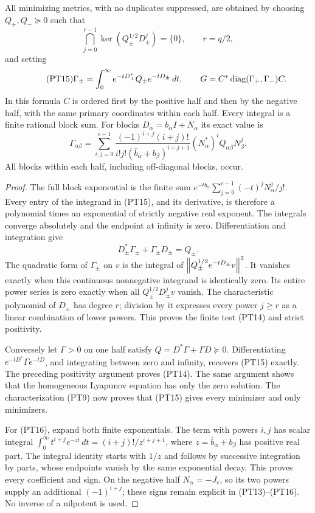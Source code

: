 \begin{theorem}
All minimizing metrics, with no duplicates suppressed, are obtained
by choosing \(Q_+,Q_-\succeq0\) such that
\begin{equation}\tag{PT14}
 \bigcap_{j=0}^{r-1}\ker(Q_\pm^{1/2}D_\pm^j)=\{0\},
 \qquad r=q/2,
\end{equation}
and setting
\begin{equation}\tag{PT15}
 \Gamma_\pm=\int_0^\infty e^{-tD_\pm^*}Q_\pm e^{-tD_\pm}\,dt,
 \qquad G=C^*\operatorname{diag}(\Gamma_+,\Gamma_-)C.
\end{equation}
In this formula \(C\) is ordered first by the positive half and
then by the negative half, with the same primary coordinates
within each half. Every integral is a finite rational block sum.
For blocks \(D_\alpha=b_\alpha I+N_\alpha\) its exact value is
\begin{equation}\tag{PT16}
 \Gamma_{\alpha\beta}
 =\sum_{i,j=0}^{e-1}
 \frac{(-1)^{i+j}(i+j)!}
      {i!j!(\bar b_\alpha+b_\beta)^{i+j+1}}
 (N_\alpha^*)^i Q_{\alpha\beta}N_\beta^j.
\end{equation}
All blocks within each half, including off-diagonal blocks, occur.
\end{theorem}
\begin{proof}
The full block exponential is the finite sum
\(e^{-tb_\alpha}\sum_{j=0}^{e-1}(-t)^jN_\alpha^j/j!\).
Every entry of the integrand in (PT15), and its derivative, is
therefore a polynomial times an exponential of strictly negative
real exponent. The integrals converge absolutely and the endpoint
at infinity is zero. Differentiation and integration give
\[
 D_\pm^*\Gamma_\pm+\Gamma_\pm D_\pm=Q_\pm.
\]
The quadratic form of \(\Gamma_\pm\) on \(v\) is the integral
of \(\left\lVert Q_\pm^{1/2}e^{-tD_\pm}v\right\rVert^2\). It vanishes
exactly when this continuous nonnegative integrand is identically
zero. Its entire power series is zero exactly when all
\(Q_\pm^{1/2}D_\pm^jv\) vanish. The characteristic polynomial
of \(D_\pm\) has degree \(r\); division by it expresses every
power \(j\ge r\) as a linear combination of lower powers.
This proves the finite test (PT14) and strict positivity.

Conversely let \(\Gamma>0\) on one half satisfy
\(Q=D^*\Gamma+\Gamma D\succeq0\). Differentiating
\(e^{-tD^*}\Gamma e^{-tD}\), and integrating between zero
and infinity, recovers (PT15) exactly. The preceding positivity
argument proves (PT14). The same argument shows that the
homogeneous Lyapunov equation has only the zero solution.
The characterization (PT9) now proves that (PT15) gives every
minimizer and only minimizers.

For (PT16), expand both finite exponentials. The term with powers
\(i,j\) has scalar integral
\(\int_0^\infty t^{i+j}e^{-zt}\,dt=(i+j)!/z^{i+j+1}\),
where \(z=\bar b_\alpha+b_\beta\) has positive real part.
The integral identity starts with \(1/z\) and follows by
successive integration by parts, whose endpoints vanish by the
same exponential decay. This proves every coefficient and sign.
On the negative half \(N_\alpha=-J_e\), so its two powers
supply an additional \((-1)^{i+j}\); these signs remain
explicit in (PT13)--(PT16). No inverse of a nilpotent is used.
\end{proof}

